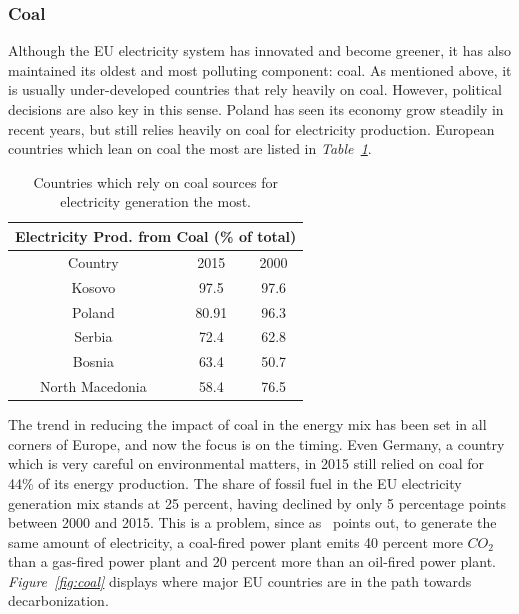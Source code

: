\documentclass[a4paper,12pt]{book}
\begin{document}
\subsubsection*{Coal}

Although the EU electricity system has innovated and become greener, it has also maintained its oldest and most polluting component: coal. As mentioned above, it is usually under-developed countries that rely heavily on coal. However, political decisions are also key in this sense. Poland has seen its economy grow steadily in recent years, but still relies heavily on coal for electricity production. European countries which lean on coal the most are listed in \textit{Table~\ref{Tab:gen}}.

\begin{table}[tb]
\begin{center}
\begin{tabular}{|c|c|c|}
\hline
\multicolumn{3}{|c|}{Electricity Prod. from Coal (\% of total)}\\
\hline
Country & 2015 & 2000 \\
\hline
Kosovo & 97.5 & 97.6\\
Poland & 80.91 & 96.3 \\
Serbia & 72.4 & 62.8 \\
Bosnia & 63.4 & 50.7\\
North Macedonia & 58.4 & 76.5\\
\hline
\end{tabular}
\caption{Countries which rely on coal sources for electricity generation the most.}
\label{Tab:gen}
\end{center}
\end{table}

The trend in reducing the impact of coal in the energy mix has been set in all corners of Europe, and now the focus is on the timing. Even Germany, a country which is very careful on environmental matters, in 2015 still relied on coal for 44\% of its energy production. The share of fossil fuel in the EU electricity generation mix stands at 25 percent, having declined by only 5 percentage points between 2000 and 2015. This is a problem, since as~\cite{tagliapietra2017beyond} points out, to generate the same amount of electricity, a coal-fired power plant emits 40 percent more $CO_2$ than a gas-fired power plant and 20 percent more than an oil-fired power plant. \textit{Figure~\ref{fig:coal}} displays where major EU countries are in the path towards decarbonization.
\end{document}
